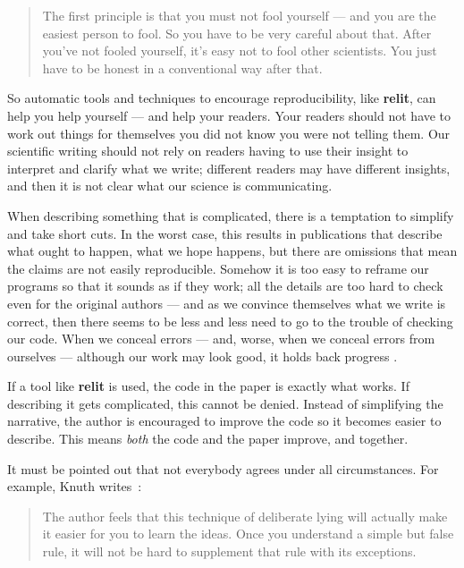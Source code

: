 \documentclass[12pt]{article}
\def\name#1{\textbf{#1}}
\begin{document}
\begin{quote}\startquote 
The first principle is that you must not fool yourself --- and you are the easiest person to fool.  So you have to be very careful about that.  After you've not fooled yourself, it's easy not to fool other scientists.  You just have to be honest in a conventional way after that.\quoteend
\end{quote}

So automatic tools and techniques to encourage reproducibility, like \name{relit}, can help you help yourself --- and help your readers. Your readers should not have to work out things for themselves you did not know you were not telling them. Our scientific writing should not rely on readers having to use their insight to interpret and clarify what we write; different readers may have different insights, and then it is not clear what our science is communicating.

When describing something that is complicated, there is a temptation to simplify and take short cuts. In the worst case, this results in publications that describe what ought to happen, what we hope happens, but there are omissions that mean the claims are not easily reproducible. Somehow it is too easy to reframe our programs so that it sounds as if they work; all the details are too hard to check even for the original authors --- and as we convince themselves what we write is correct, then there seems to be less and less need to go to the trouble of checking our code. When we conceal errors --- and, worse, when we conceal errors from ourselves --- although our work may look good, it holds back progress \cite{blackbox}.

If a tool like \name{relit} is used, the code in the paper is exactly what works. If describing it gets complicated, this cannot be denied. Instead of simplifying the narrative, the author is encouraged to improve the code so it becomes easier to describe. This means \emph{both\/} the code and the paper improve, and together.

It must be pointed out that not everybody agrees under all circumstances. For example, Knuth writes~\cite[p\emph{vii}]{texbook}:

\begin{quote}\startquote 
The author feels that this technique of deliberate lying will actually make it easier for you to learn the ideas. Once you understand a simple but false rule, it will not be hard to supplement that rule with its exceptions.\quoteend
\end{quote}
\end{document}
